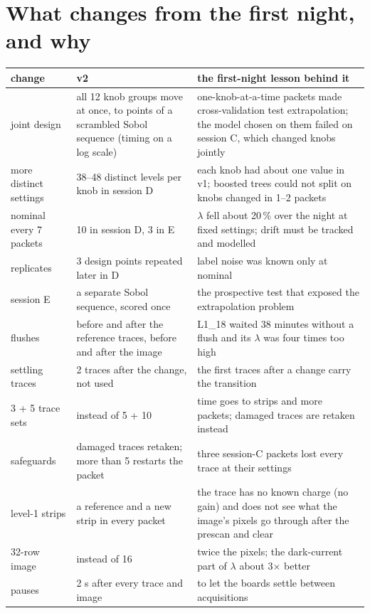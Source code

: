 \documentclass[11pt]{article}
\begin{document}
\section{What changes from the first night, and why}

\begin{longtable}{p{3.2cm}p{5.3cm}p{6.7cm}}
\toprule
change & v2 & the first-night lesson behind it\\\midrule
\endhead
joint design & all 12 knob groups move at once, to points of a scrambled Sobol sequence (timing on a log scale) &
  one-knob-at-a-time packets made cross-validation test extrapolation; the model chosen on them failed on session C,
  which changed knobs jointly\\
more distinct settings & 38--48 distinct levels per knob in session D & each knob had about one value in v1; boosted
  trees could not split on knobs changed in 1--2 packets\\
nominal every 7 packets & 10 in session D, 3 in E & $\lambda$ fell about 20\,\% over the night at fixed settings; drift
  must be tracked and modelled\\
replicates & 3 design points repeated later in D & label noise was known only at nominal\\
session E & a separate Sobol sequence, scored once & the prospective test that exposed the extrapolation problem\\
flushes & before and after the reference traces, before and after the image & L1\_18 waited 38 minutes without a flush
  and its $\lambda$ was four times too high\\
settling traces & 2 traces after the change, not used & the first traces after a change carry the transition\\
3 + 5 trace sets & instead of 5 + 10 & time goes to strips and more packets; damaged traces are retaken instead\\
safeguards & damaged traces retaken; more than 5 restarts the packet & three session-C packets lost every trace at their
  settings\\
level-1 strips & a reference and a new strip in every packet & the trace has no known charge (no gain) and does not see
  what the image's pixels go through after the prescan and clear\\
32-row image & instead of 16 & twice the pixels; the dark-current part of $\lambda$ about 3$\times$ better\\
pauses & 2 s after every trace and image & to let the boards settle between acquisitions\\

\end{longtable}
\end{document}

